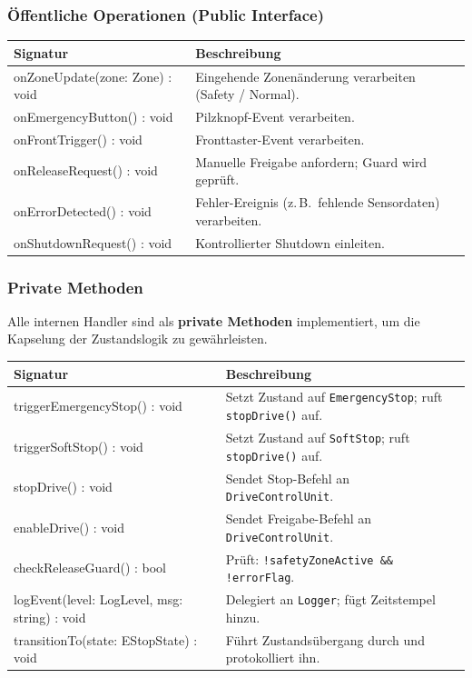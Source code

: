 \subsubsection{Öffentliche Operationen (Public Interface)}

\begin{center}
\renewcommand{\arraystretch}{1.3}
\begin{tabular}{>{\ttfamily}p{6.5cm} p{7cm}}
  \toprule
  \normalfont\textbf{Signatur} & \normalfont\textbf{Beschreibung} \\
  \midrule
  onZoneUpdate(zone: Zone) : void
    & Eingehende Zonenänderung verarbeiten (Safety / Normal). \\
  onEmergencyButton() : void
    & Pilzknopf-Event verarbeiten. \\
  onFrontTrigger() : void
    & Fronttaster-Event verarbeiten. \\
  onReleaseRequest() : void
    & Manuelle Freigabe anfordern; Guard wird geprüft. \\
  onErrorDetected() : void
    & Fehler-Ereignis (z.\,B.\ fehlende Sensordaten) verarbeiten. \\
  onShutdownRequest() : void
    & Kontrollierter Shutdown einleiten. \\
  \bottomrule
\end{tabular}
\end{center}

\subsubsection{Private Methoden}

Alle internen Handler sind als \textbf{private Methoden} implementiert,
um die Kapselung der Zustandslogik zu gewährleisten.

\begin{center}
\renewcommand{\arraystretch}{1.3}
\begin{tabular}{>{\ttfamily}p{6.5cm} p{7cm}}
  \toprule
  \normalfont\textbf{Signatur} & \normalfont\textbf{Beschreibung} \\
  \midrule
  triggerEmergencyStop() : void
    & Setzt Zustand auf \texttt{EmergencyStop}; ruft \texttt{stopDrive()} auf. \\
  triggerSoftStop() : void
    & Setzt Zustand auf \texttt{SoftStop}; ruft \texttt{stopDrive()} auf. \\
  stopDrive() : void
    & Sendet Stop-Befehl an \texttt{DriveControlUnit}. \\
  enableDrive() : void
    & Sendet Freigabe-Befehl an \texttt{DriveControlUnit}. \\
  checkReleaseGuard() : bool
    & Prüft: \texttt{!safetyZoneActive \&\& !errorFlag}. \\
  logEvent(level: LogLevel, msg: string) : void
    & Delegiert an \texttt{Logger}; fügt Zeitstempel hinzu. \\
  transitionTo(state: EStopState) : void
    & Führt Zustandsübergang durch und protokolliert ihn. \\
  \bottomrule
\end{tabular}
\end{center}

